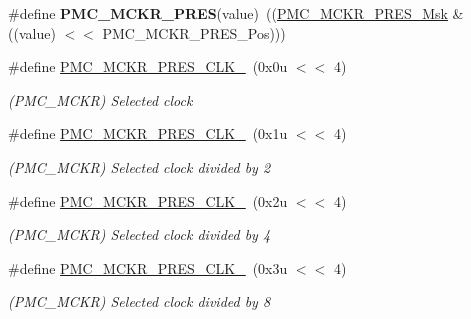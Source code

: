 \begin{DoxyCompactItemize}
\#define {\bfseries P\+M\+C\+\_\+\+M\+C\+K\+R\+\_\+\+P\+R\+ES}(value)~((\mbox{\hyperlink{group__SAMV71__PMC_gadc14167dbb6ea635a41df3b41c8b9e84}{P\+M\+C\+\_\+\+M\+C\+K\+R\+\_\+\+P\+R\+E\+S\+\_\+\+Msk}} \& ((value) $<$$<$ P\+M\+C\+\_\+\+M\+C\+K\+R\+\_\+\+P\+R\+E\+S\+\_\+\+Pos)))
\item 
\mbox{\label{group__SAME70__PMC_ga87c51808043d0df9e79baf64dcd172df}} 
\#define \mbox{\hyperlink{group__SAME70__PMC_ga87c51808043d0df9e79baf64dcd172df}{P\+M\+C\+\_\+\+M\+C\+K\+R\+\_\+\+P\+R\+E\+S\+\_\+\+C\+L\+K\+\_}}~(0x0u $<$$<$ 4)
\begin{DoxyCompactList}\small\item\em (P\+M\+C\+\_\+\+M\+C\+KR) Selected clock \end{DoxyCompactList}\item 
\mbox{\label{group__SAME70__PMC_ga1e304039640aaab4c22e5226c0b21f41}} 
\#define \mbox{\hyperlink{group__SAME70__PMC_ga1e304039640aaab4c22e5226c0b21f41}{P\+M\+C\+\_\+\+M\+C\+K\+R\+\_\+\+P\+R\+E\+S\+\_\+\+C\+L\+K\+\_}}~(0x1u $<$$<$ 4)
\begin{DoxyCompactList}\small\item\em (P\+M\+C\+\_\+\+M\+C\+KR) Selected clock divided by 2 \end{DoxyCompactList}\item 
\mbox{\label{group__SAME70__PMC_ga0e5f5657a40b36bdb8cf9c194d071b78}} 
\#define \mbox{\hyperlink{group__SAME70__PMC_ga0e5f5657a40b36bdb8cf9c194d071b78}{P\+M\+C\+\_\+\+M\+C\+K\+R\+\_\+\+P\+R\+E\+S\+\_\+\+C\+L\+K\+\_}}~(0x2u $<$$<$ 4)
\begin{DoxyCompactList}\small\item\em (P\+M\+C\+\_\+\+M\+C\+KR) Selected clock divided by 4 \end{DoxyCompactList}\item 
\mbox{\label{group__SAME70__PMC_gac6733179b1d3014df5d1a5e39faebf3c}} 
\#define \mbox{\hyperlink{group__SAME70__PMC_gac6733179b1d3014df5d1a5e39faebf3c}{P\+M\+C\+\_\+\+M\+C\+K\+R\+\_\+\+P\+R\+E\+S\+\_\+\+C\+L\+K\+\_}}~(0x3u $<$$<$ 4)
\begin{DoxyCompactList}\small\item\em (P\+M\+C\+\_\+\+M\+C\+KR) Selected clock divided by 8 \end{DoxyCompactList}\item 
$$
\end{DoxyCompactItemize}

